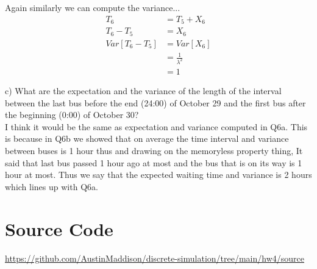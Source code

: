 \documentclass[twocolumn]{article}
\begin{document}
Again similarly we can compute the variance...
\begin{align*}
	T_6 &= T_5 + X_6\\
	T_6 - T_5 &= X_6\\	
	Var[T_6 - T_5] &= Var[X_6]\\
	&= \frac{1}{\lambda^2}\\
	&= 1	
\end{align*}


\noindent
\mm c) What are the expectation and the variance of the length of the interval between
the last bus before the end (24:00) of October 29 and the first bus after the
beginning (0:00) of October 30? \normalfont\\

I think it would be the same as expectation and variance computed in Q6a. This is because in Q6b we showed that on average the time interval and variance between buses is 1 hour thus and drawing on the memoryless property thing, It said that last bus passed 1 hour ago at most and the bus that is on its way is 1 hour at most. Thus we say that the expected waiting time and variance is 2 hours which lines up with Q6a. 


	


\section*{Source Code}
\href{https://github.com/AustinMaddison/discrete-simulation/tree/main/HW4/source}{https://github.com/AustinMaddison/discrete-simulation/tree/main/hw4/source}

%
%
\end{document}
